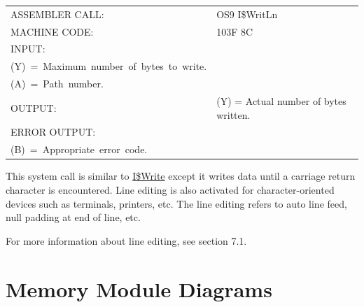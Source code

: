 \documentclass[
]{article}
\newcounter{none} %
\begin{document}
{\def\LTcaptype{none} %
\begin{longtable}[]{@{}
  >{\raggedright\arraybackslash}p{}
  >{\raggedright\arraybackslash}p{}@{}}
\toprule\noalign{}
\endhead
\bottomrule\noalign{}
\endlastfoot
ASSEMBLER CALL: & OS9 I\$WritLn \\
MACHINE CODE: & 103F 8C \\
INPUT: & \begin{minipage}[t]{\linewidth}\raggedright
(X)~=~Address~of~data~to~write.\\
(Y)~=~Maximum~number~of~bytes~to~write.\\
(A)~=~Path~number.
\end{minipage} \\
OUTPUT: & (Y) = Actual number of bytes written. \\
ERROR OUTPUT: & \begin{minipage}[t]{\linewidth}\raggedright
(CC)~=~C~bit~set.\\
(B)~=~Appropriate~error~code.
\end{minipage} \\
\end{longtable}
}

This system call is similar to \hyperref[i.write]{I\$Write} except it
writes data until a carriage return character is encountered. Line
editing is also activated for character-oriented devices such as
terminals, printers, etc. The line editing refers to auto line feed,
null padding at end of line, etc.

For more information about line editing, see section 7.1.

\section{Memory Module Diagrams}
\end{document}
